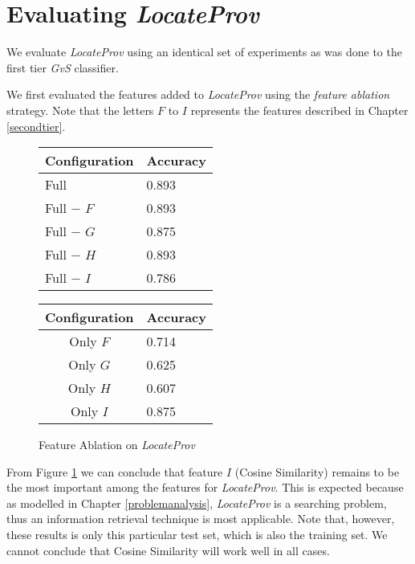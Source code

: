 \section{Evaluating {\it LocateProv}}
\label{eval:second}
We evaluate {\it LocateProv} using an identical set of experiments as was done to the first tier {\it GvS} classifier.

We first evaluated the features added to {\it LocateProv} using the {\it feature ablation} strategy. Note that the letters $F$ to $I$ represents the features described in Chapter \ref{secondtier}.

\begin{figure}[ht]
\begin{minipage}[b]{0.45\linewidth}\centering
\begin{tabular}{ l | l }
Configuration & Accuracy \\
\hline
Full			& 0.893 \\
Full $-$ $F$	& 0.893 \\
Full $-$ $G$	& 0.875 \\
Full $-$ $H$	& 0.893 \\
Full $-$ $I$	& 0.786 \\
\end{tabular}
\end{minipage}
\hspace{0.5cm}
\begin{minipage}[b]{0.45\linewidth}\centering
\begin{tabular}{ c | l }
Configuration & Accuracy \\
\hline
Only $F$	& 0.714 \\
Only $G$	& 0.625 \\
Only $H$	& 0.607 \\
Only $I$	& 0.875 \\
\end{tabular}
\end{minipage}
\caption{Feature Ablation on {\it LocateProv}}
\label{fig:ablation_second}
\end{figure}
From Figure \ref{fig:ablation_second} we can conclude that feature $I$ (Cosine Similarity) remains to be the most important among the features for {\it LocateProv}. This is expected because as modelled in Chapter \ref{problemanalysis}, {\it LocateProv} is a searching problem, thus an information retrieval technique is most applicable. 
Note that, however, these results is only this particular test set, which is also the training set. We cannot conclude that Cosine Similarity will work well in all cases.

